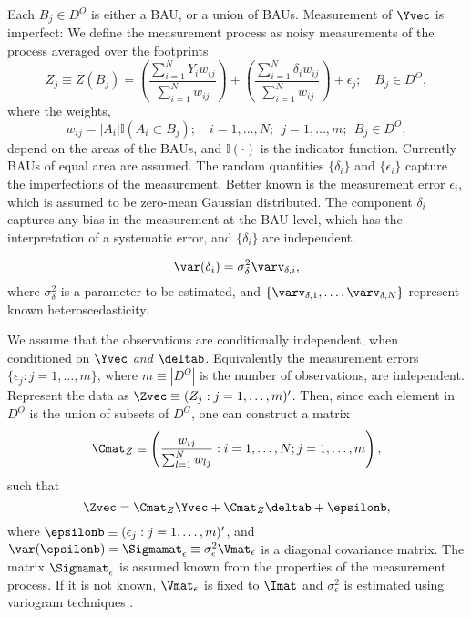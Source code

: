 Each $B_j \in D^O$ is either a BAU, or a union of BAUs. Measurement of $\Yvec$ is imperfect: We define the measurement process as noisy measurements of the process averaged over the footprints
\begin{equation}\label{eq:meas_process}
Z_j \equiv Z(B_j) = \left(\frac{\sum_{i =1}^N Y_i w_{ij}}{\sum_{i=1}^N w_{ij}}\right) + \left(\frac{\sum_{i =1}^N \delta_i w_{ij}}{\sum_{i=1}^N w_{ij}}\right) + \epsilon_j; \quad B_j \in D^O,
\end{equation}
where the weights,
$$ w_{ij} = |A_i|\mathbb{I}(A_i \subset B_j); \quad i = 1,\dots,N;~~j = 1,\dots, m; ~~B_j \in D^O,$$
depend on the areas of the BAUs, and $\mathbb{I}(\cdot)$ is the indicator function. Currently BAUs of equal area are assumed.   The random quantities $\{\delta_i\}$ and $\{\epsilon_i\}$ capture the imperfections of the measurement. Better known is the measurement error $\epsilon_i$, which is assumed to be zero-mean Gaussian distributed. The component $\delta_i$ captures any bias in the measurement at the BAU-level, which has the interpretation of a systematic error, and $\{\delta_i\}$ are independent.


\begin{equation}
\var(\delta_i) = \sigma^2_\delta \varv_{\delta,i},
\end{equation}
where $\sigma^2_\delta$ is a parameter to be estimated, and $\{\varv_{\delta,1},\dots,\varv_{\delta,N}\}$  represent known heteroscedasticity.

We assume that the observations are conditionally independent, when conditioned on $\Yvec$ \emph{and} $\deltab$. Equivalently the measurement errors $\{\epsilon_j: j = 1,\dots,m\}$, where $m \equiv |D^O|$ is the number of observations, are independent. Represent the data as $\Zvec \equiv (Z_j : j = 1,\dots,m)'$. Then, since each element in $D^O$ is the union of subsets of $D^G$, one can construct a matrix
$$
\Cmat_Z \equiv \left(\frac{w_{ij}}{\sum_{l=1}^N w_{lj}} : i = 1,\dots,N; j = 1,\dots,m\right),
$$
such that
\begin{equation}
\Zvec = \Cmat_Z\Yvec + \Cmat_Z\deltab +  \epsilonb,
\end{equation}
\noindent where $\epsilonb \equiv (\epsilon_j : j = 1,\dots,m)'$, and $\var(\epsilonb) = \Sigmamat_\epsilon \equiv \sigma^2_\epsilon\Vmat_\epsilon$ is a diagonal covariance matrix. The matrix $\Sigmamat_\epsilon$ is assumed known from the properties of the measurement process. If it is not known, $\Vmat_\epsilon$ is fixed to $\Imat$ and $\sigma^2_\epsilon$ is estimated using variogram techniques \citep{Kang_2009}.

